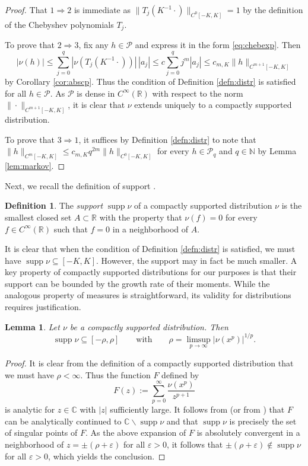 \documentclass[10pt,reqno]{amsart}
\newtheorem{lem}[thm]{Lemma}
\theoremstyle{definition}
\newtheorem{defn}[thm]{Definition}
\theoremstyle{remark}
\numberwithin{equation}{section}
\numberwithin{figure}{section}
\numberwithin{table}{section}
\newcommand{\supp}{\mathop{\mathrm{supp}}}
\begin{document}
\begin{proof}
That $1\Rightarrow 2$ is immediate as
$\|T_j(K^{-1}\cdot)\|_{C^0[-K,K]}=1$ by the definition of 
the Chebyshev polynomials $T_j$.

To prove that $2\Rightarrow 3$, fix any $h\in\mathcal{P}$ and express
it in the form \eqref{eq:chebexp}. Then 
$$
	|\nu(h)| \le
	\sum_{j=0}^q |\nu(T_j(K^{-1}\cdot))|\,|a_j| \le
	c\sum_{j=0}^q j^m|a_j|
	\le c_{m,K} \|h\|_{C^{m+1}[-K,K]}
$$
by Corollary \ref{cor:abscp}. Thus the condition of Definition 
\ref{defn:distr} is satisfied for all $h\in\mathcal{P}$.
As $\mathcal{P}$ is dense in $C^\infty(\mathbb{R})$ with respect to
the norm $\|\cdot\|_{C^{m+1}[-K,K]}$, it is clear that $\nu$ extends
uniquely to a compactly supported distribution.

To prove that $3\Rightarrow 1$, it suffices by Definition 
\ref{defn:distr} to note that $\|h\|_{C^m[-K,K]}\le 
c_{m,K} q^{2m}\|h\|_{C^0[-K,K]}$ for every 
$h\in\mathcal{P}_q$ and $q\in\mathbb{N}$ by Lemma \ref{lem:markov}.
\end{proof}

Next, we recall the definition of support \cite[\S 2.2]{Hor03}.

\begin{defn}
The \emph{support} $\supp\nu$ of a compactly supported distribution $\nu$ 
is the smallest closed set $A\subset\mathbb{R}$ with the property that 
$\nu(f)=0$ for every $f\in C^\infty(\mathbb{R})$ such that $f=0$ in a 
neighborhood of $A$.
\end{defn}

It is clear that when the condition of Definition \ref{defn:distr} is 
satisfied, we must have $\supp\nu\subseteq [-K,K]$. However, the support 
may in fact be much smaller. A key property of compactly supported 
distributions for our purposes is that their support can be bounded by the 
growth rate of their moments. While the analogous property of measures is 
straightforward, its validity for distributions requires justification.

\begin{lem}
\label{lem:distsupp}
Let $\nu$ be a compactly supported distribution. Then
$$
        \supp\nu \subseteq [-\rho,\rho] \qquad\text{with}\qquad
        \rho = \limsup_{p\to\infty} |\nu(x^p)|^{1/p}.
$$
\end{lem}

\begin{proof}
It is clear from the definition of a compactly supported distribution that 
we must have $\rho<\infty$. Thus the function $F$ defined by
$$
        F(z) := \sum_{p=0}^\infty \frac{\nu(x^p)}{z^{p+1}}
$$
is analytic for $z\in\mathbb{C}$ with $|z|$ sufficiently large. It follows
from \cite[Lemma 1]{EK87} (or from \cite[Theorem 5.4]{Sch05}) that
$F$ can be analytically continued to $\mathbb{C}\backslash\supp\nu$ and
that $\supp\nu$ is precisely the set of singular points of $F$.
As the above expansion of $F$ is absolutely convergent in a 
neighborhood of $z=\pm(\rho+\varepsilon)$ for all $\varepsilon>0$, it 
follows that $\pm(\rho+\varepsilon)\not\in\supp\nu$ for all 
$\varepsilon>0$, which yields the conclusion.
\end{proof}
\end{document}
